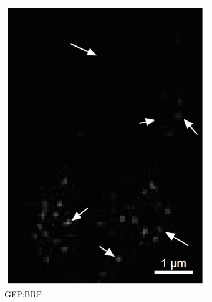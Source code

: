 \begin{figure}
	
	\begin{subfigure}[t]{0.237\textwidth}
		\centering
		\includegraphics[width=\linewidth]{images/DeepSIM_NMJ_woAO_ROI1_GFP.jpg}
		\caption{GFP:BRP}
		\label{fig:DeepSIM_NMJ_woAO_ROI1_GFP}
	\end{subfigure}
	\begin{subfigure}[t]{0.235\textwidth}
		\centering

\end{subfigure}
\end{figure}
